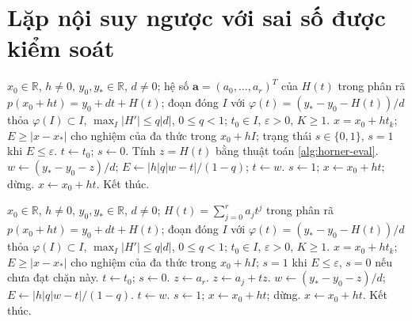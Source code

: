 \documentclass[12pt,a4paper,oneside]{book}
\numberwithin{algorithm}{chapter}
\theoremstyle{definition}
\newcommand{\R}{\mathbb{R}}
\begin{document}
\section{Lặp nội suy ngược với sai số được kiểm soát}
\begin{algorithm}[H]
\caption{Lặp nội suy ngược: sơ lược}
\label{alg:inverse-iteration-short}
\begin{algorithmic}[1]
\Require $x_0\in\R$, $h\ne0$, $y_0,y_\ast\in\R$, $d\ne0$; hệ số $\boldsymbol a=(a_0,\ldots,a_r)^T$ của $H(t)$ trong phân rã $p(x_0+ht)=y_0+dt+H(t)$; đoạn đóng $I$ với $\varphi(t)=(y_\ast-y_0-H(t))/d$ thỏa $\varphi(I)\subset I$, $\max_I|H'|\leq q|d|$, $0\leq q<1$; $t_0\in I$, $\varepsilon>0$, $K\geq1$.
\Ensure $x=x_0+ht_k$; $E\geq|x-x_\ast|$ cho nghiệm của đa thức trong $x_0+hI$; trạng thái $s\in\{0,1\}$, $s=1$ khi $E\leq\varepsilon$.
\State $t\gets t_0$; $s\gets0$.
 \State Tính $z=H(t)$ bằng thuật toán \ref{alg:horner-eval}.
 \State $w\gets(y_\ast-y_0-z)/d$; $E\gets |h|q|w-t|/(1-q)$; $t\gets w$.
  \State $s\gets1$; $x\gets x_0+ht$; dừng.
 \EndIf
\EndFor
\Statex
\State $x\gets x_0+ht$.
\State Kết thúc.
\end{algorithmic}
\end{algorithm}
\begin{algorithm}[H]
\caption{Lặp nội suy ngược: chi tiết}
\label{alg:inverse-iteration}
\begin{algorithmic}[1]
\Require $x_0\in\R$, $h\ne0$, $y_0,y_\ast\in\R$, $d\ne0$; $H(t)=\sum_{j=0}^{r}a_jt^j$ trong phân rã $p(x_0+ht)=y_0+dt+H(t)$; đoạn đóng $I$ với $\varphi(t)=(y_\ast-y_0-H(t))/d$ thỏa $\varphi(I)\subset I$, $\max_I|H'|\leq q|d|$, $0\leq q<1$; $t_0\in I$, $\varepsilon>0$, $K\geq1$.
\Ensure $x=x_0+ht_k$; $E\geq|x-x_\ast|$ cho nghiệm của đa thức trong $x_0+hI$; $s=1$ khi $E\leq\varepsilon$, $s=0$ nếu chưa đạt chặn này.
\State $t\gets t_0$; $s\gets0$.
 \State $z\gets a_r$.
  \State $z\gets a_j+tz$.
 \EndFor
 \Statex
 \State $w\gets(y_\ast-y_0-z)/d$; $E\gets|h|q|w-t|/(1-q)$.
 \State $t\gets w$.
  \State $s\gets1$; $x\gets x_0+ht$; dừng.
 \EndIf
\EndFor
\Statex
\State $x\gets x_0+ht$.
\State Kết thúc.
\end{algorithmic}
\end{algorithm}

\end{document}
